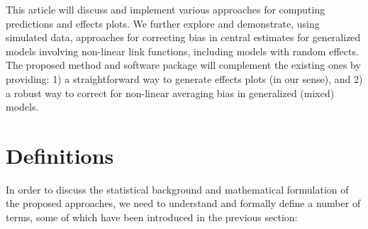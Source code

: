 This article will discuss and implement various approaches for computing predictions and effects plots. We further explore and demonstrate, using simulated data, approaches for correcting bias in central estimates for generalized models involving non-linear link functions, including models with random effects. The proposed method and  software package will complement the existing ones by providing: 1) a straightforward way to generate effects plots (in our sense), and 2) a robust way to correct for non-linear averaging bias in generalized (mixed) models. 

\section{Definitions}

In order to discuss the statistical background and mathematical formulation of the proposed approaches, we need to understand and formally define a number of terms, some of which have been introduced in the previous section:

